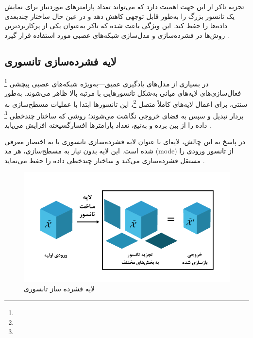 تجزیه تاکر از این جهت اهمیت دارد که می‌تواند تعداد پارامترهای موردنیاز برای نمایش یک تانسور بزرگ را به‌طور قابل توجهی کاهش دهد و در عین حال ساختار چندبعدی داده‌ها را حفظ کند. این ویژگی باعث شده که تاکر به‌عنوان یکی از پرکاربردترین روش‌ها در فشرده‌سازی و مدل‌سازی شبکه‌های عصبی مورد استفاده قرار گیرد \cite{novikov2015tensorizing,kossaifi2017tensor}.

\subsection{لایه فشرده‌سازی تانسوری}

در بسیاری از مدل‌های یادگیری عمیق—به‌ویژه شبکه‌های عصبی پیچشی 
\footnote{}
 فعال‌سازی‌های لایه‌های میانی به‌شکل تانسورهایی با مرتبه بالا ظاهر می‌شوند. به‌طور سنتی، برای اعمال لایه‌های کاملاً متصل \footnote{}، این تانسورها ابتدا با عملیات مسطح‌سازی  به بردار تبدیل و سپس به فضای خروجی نگاشت می‌شوند؛ روشی که ساختار چندخطی \footnote{} داده را از بین برده و به‌تبع، تعداد پارامترها افسارگسیخته افزایش می‌یابد \cite{kossaifi2020tensorregression}.

در پاسخ به این چالش، لایه‌ای با عنوان ­لایه فشرده‌سازی تانسوری یا به اختصار  معرفی شده است. این لایه بدون نیاز به مسطح‌سازی، هر مد (mode) از تانسور ورودی را مستقل فشرده‌سازی می‌کند و ساختار چندخطی داده را حفظ می‌نماید \cite{kossaifi2017tensorcontraction,kossaifi2020tensorregression}.



\begin{figure}[h]
	\centering
	\begin{minipage}[b]{0.7\textwidth}
		\centering
		\includegraphics[width=\textwidth]{transformer_images/persian images/b14.png}
		\caption{لایه فشرده ساز تانسوری}
		\label{fig:tensor_contraction_layer}
	\end{minipage}
	\hfill
\end{figure}




